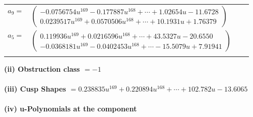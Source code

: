 \documentclass[1p]{elsarticle_modified}
\theoremstyle{definition}
\begin{document}
\begin{tabular}{m{7pt} m{180pt} m{7pt} m{180pt} }
\flushright $a_{9}=$&$\begin{pmatrix}-0.0756754 u^{169}-0.177887 u^{168}+\cdots+1.02654 u-11.6728\\0.0239517 u^{169}+0.0570506 u^{168}+\cdots+10.1931 u+1.76379\end{pmatrix}$ \\
\flushright $a_{5}=$&$\begin{pmatrix}0.119936 u^{169}+0.0216596 u^{168}+\cdots+43.5327 u-20.6550\\-0.0368181 u^{169}-0.0402453 u^{168}+\cdots-15.5079 u+7.91941\end{pmatrix}$\\&\end{tabular}
\flushleft \textbf{(ii) Obstruction class $= -1$}\\~\\
\flushleft \textbf{(iii) Cusp Shapes $= 0.238835 u^{169}+0.220894 u^{168}+\cdots+102.782 u-13.6065$}\\~\\
\newpage\renewcommand{\arraystretch}{1}
\flushleft \textbf{(iv) u-Polynomials at the component}\newline \\
\end{document}
